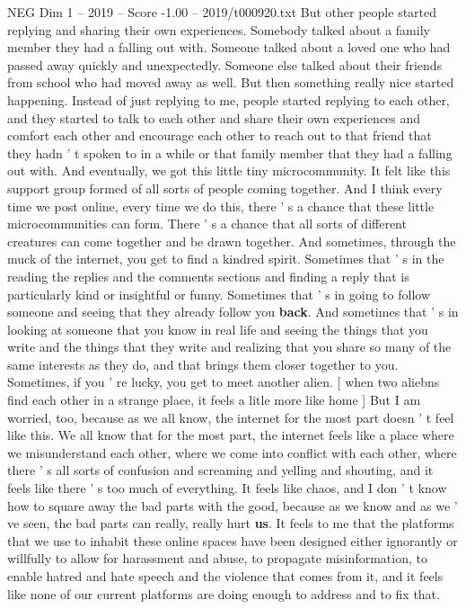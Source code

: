 \begin{textsample}{NEG Dim 1 – 2019 – Score -1.00 – 2019/t000920.txt}
But other people started replying and sharing their own experiences.
Somebody talked about a family member they had a falling out with.
Someone talked about a loved one who had passed away quickly and unexpectedly.
Someone else talked about their friends from school who had moved away as well.
But then something really nice started happening.
Instead of just replying to me, people started replying to each other, and they started to talk to each other and share their own experiences and comfort each other and encourage each other to reach out to that friend that they hadn ' t spoken to in a while or that family member that they had a falling out with.
And eventually, we got this little tiny microcommunity.
It felt like this support group formed of all sorts of people coming together.
And I think every time we post online, every time we do this, there ' s a chance that these little microcommunities can form.
There ' s a chance that all sorts of different creatures can come together and be drawn together.
And sometimes, through the muck of the internet, you get to find a kindred spirit.
Sometimes that ' s in the reading the replies and the comments sections and finding a reply that is particularly kind or insightful or funny.
Sometimes that ' s in going to follow someone and seeing that they already follow you \textbf{back}.
And sometimes that ' s in looking at someone that you know in real life and seeing the things that you write and the things that they write and realizing that you share so many of the same interests as they do, and that brings them closer together to you.
Sometimes, if you ' re lucky, you get to meet another alien. [ when two aliebns find each other in a strange place, it feels a litle more like home ] But I am worried, too, because as we all know, the internet for the most part doesn ' t feel like this.
We all know that for the most part, the internet feels like a place where we misunderstand each other, where we come into conflict with each other, where there ' s all sorts of confusion and screaming and yelling and shouting, and it feels like there ' s too much of everything.
It feels like chaos, and I don ' t know how to square away the bad parts with the good, because as we know and as we ' ve seen, the bad parts can really, really hurt \textbf{us}.
It feels to me that the platforms that we use to inhabit these online spaces have been designed either ignorantly or willfully to allow for harassment and abuse, to propagate misinformation, to enable hatred and hate speech and the violence that comes from it, and it feels like none of our current platforms are doing enough to address and to fix that.

\end{textsample}
